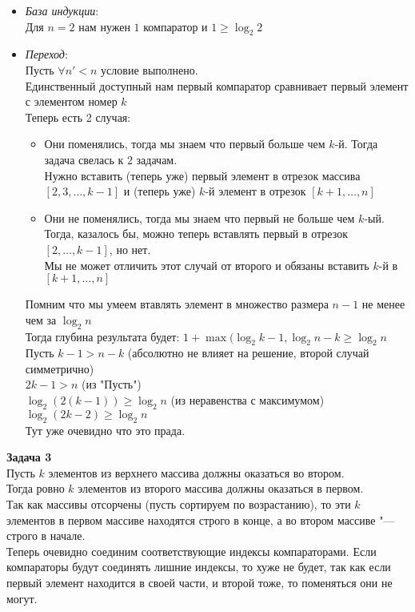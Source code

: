 \documentclass[14pt,a4paper,report]{ncc}
\begin{document}
\begin{itemize}
    \item {
        \textit{База индукции}:\\
        Для $n = 2$ нам нужен $1$ компаратор и $1 \geq \log_2{2}$
    }
    \item {
        \textit{Переход}:\\
        Пусть $\forall n' < n$ условие выполнено.\\
        Единственный доступный нам первый компаратор сравнивает первый элемент с элементом номер $k$\\
        Теперь есть 2 случая:
        \begin{itemize}
            \item {Они поменялись, тогда мы знаем что первый больше чем $k$-й. Тогда задача свелась к 2 задачам.\\Нужно вставить (теперь уже) первый элемент в отрезок массива $[2, 3, \ldots, k - 1]$ и (теперь уже) $k$-й элемент в отрезок $[k + 1, \ldots, n]$}
            \item {Они не поменялись, тогда мы знаем что первый не больше чем $k$-ый. Тогда, казалось бы, можно теперь вставлять первый в отрезок $[2, \ldots, k - 1]$, но нет.\\
            Мы не может отличить этот случай от второго и обязаны вставить $k$-й в $[k + 1, \ldots, n]$}
        \end{itemize}
        Помним что мы умеем втавлять элемент в множество размера $n - 1$ не менее чем за $\log_2{n}$\\
        Тогда глубина результата будет: $1 + \max(\log_2{k - 1}, \log_2{n - k} \geq \log_2{n}$\\
        Пусть $k - 1 > n - k$ (абсолютно не влияет на решение, второй случай симметрично)\\
        $2k - 1 > n$ (из "Пусть")\\
        $\log_2(2(k - 1)) \geq \log_2{n}$ (из неравенства с максимумом)\\
        $\log_2(2k - 2) \geq \log_2{n}$\\
        Тут уже очевидно что это прада.
    }
\end{itemize}

\textbf{Задача 3}\\
Пусть $k$ элементов из верхнего массива должны оказаться во втором.\\
Тогда ровно $k$ элементов из второго массива должны оказаться в первом.\\
Так как массивы отсорчены (пусть сортируем по возрастанию), то эти $k$ элементов в первом массиве находятся строго в конце, а во втором массиве "--- строго в начале.\\
Теперь очевидно соединим соответствующие индексы компараторами. Если компараторы будут соединять лишние индексы, то хуже не будет, так как если первый элемент находится в своей части, и второй тоже, то поменяться они не могут.
\end{document}

